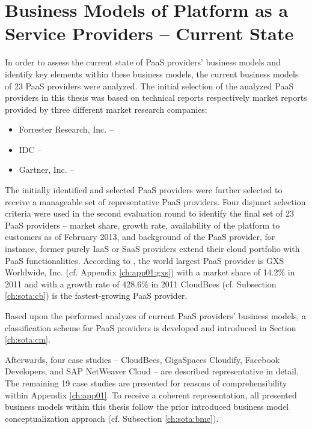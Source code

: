 \chapter{Business Models of Platform as a Service Providers -- Current State}\label{ch:sota}

In order to assess the current state of \ac{PaaS} providers' business models and identify key elements within these business models, the current business models of 23 \ac{PaaS} providers were analyzed. The initial selection of the analyzed \ac{PaaS} providers in this thesis was based on technical reports respectively market reports provided by three different market research companies:
\begin{itemize}
	\item Forrester Research, Inc. -- \citet{Ried2011a,Rymer2011}
	\item \ac{IDC} -- \citet{Bradshaw2012,Hendrick2012, Hendrick2012a}
	\item Gartner, Inc. -- \citet{Smith2012}
\end{itemize}
The initially identified and selected \ac{PaaS} providers were further selected to receive a manageable set of representative \ac{PaaS} providers. Four disjunct selection criteria were used in the second evaluation round to identify the final set of 23 \ac{PaaS} providers -- market share, growth rate, availability of the platform to customers as of February 2013, and background of the \ac{PaaS} provider, for instance, former purely \ac{IaaS} or \ac{SaaS} providers extend their cloud portfolio with \ac{PaaS} functionalities. According to \citet{Hendrick2012}, the world largest \ac{PaaS} provider is GXS Worldwide, Inc. (cf. Appendix \ref{ch:app01:gxs}) with a market share of 14.2\% in 2011 and with a growth rate of 428.6\% in 2011 CloudBees (cf. Subsection \ref{ch:sota:cb}) is the fastest-growing \ac{PaaS} provider.

Based upon the performed analyzes of current \ac{PaaS} providers' business models, a classification scheme for \ac{PaaS} providers is developed and introduced in Section \ref{ch:sota:cm}.

Afterwards, four case studies -- CloudBees, GigaSpaces Cloudify, Facebook Developers, and SAP NetWeaver Cloud -- are described representative in detail. The remaining 19 case studies are presented for reasons of comprehensibility within Appendix \ref{ch:app01}. To receive a coherent representation, all presented business models within this thesis follow the prior introduced business model conceptualization approach (cf. Subsection \ref{ch:sota:bmc}).

